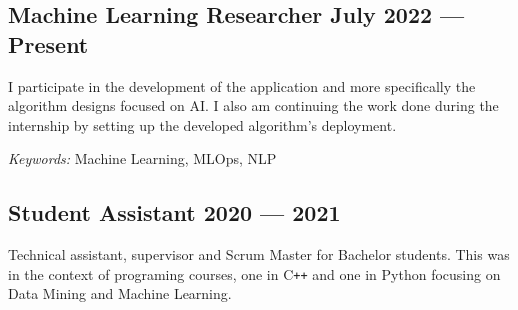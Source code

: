 \subsection{Machine Learning Researcher \hfill July 2022 --- Present}
\vspace{0.7\baselineskip}

I participate in the development of the application and more specifically the algorithm designs focused on AI. I also
am continuing the work done during the internship by setting up the developed algorithm's deployment.

\textit{Keywords:} Machine Learning, MLOps, NLP
\vspace{0.35\baselineskip}




\subsection{Student Assistant \hfill 2020 --- 2021}
\vspace{0.7\baselineskip}

Technical assistant, supervisor and Scrum Master for Bachelor students. This was in the context of programing courses,
one in C\texttt{++} and one in Python focusing on Data Mining and Machine Learning.

